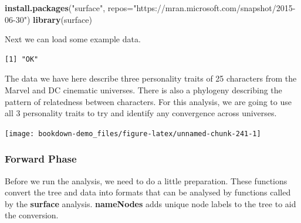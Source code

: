 \documentclass[
]{book}
\newenvironment{Shaded}{\begin{snugshade}}{\end{snugshade}}
\newcommand{\DataTypeTok}[1]{\textcolor[rgb]{0.13,0.29,0.53}{#1}}
\newcommand{\KeywordTok}[1]{\textcolor[rgb]{0.13,0.29,0.53}{\textbf{#1}}}
\newcommand{\NormalTok}[1]{#1}
\newcommand{\OperatorTok}[1]{\textcolor[rgb]{0.81,0.36,0.00}{\textbf{#1}}}
\newcommand{\StringTok}[1]{\textcolor[rgb]{0.31,0.60,0.02}{#1}}
\begin{document}
\begin{Shaded}
\begin{Highlighting}[]
\KeywordTok{install.packages}\NormalTok{(}\StringTok{"surface"}\NormalTok{, }\DataTypeTok{repos=}\StringTok{"https://mran.microsoft.com/snapshot/2015{-}06{-}30"}\NormalTok{)}
\KeywordTok{library}\NormalTok{(surface)}
\end{Highlighting}
\end{Shaded}

Next we can load some example data.

\begin{Shaded}
\end{Shaded}

\begin{verbatim}
[1] "OK"
\end{verbatim}

The data we have here describe three personality traits of 25 characters from the Marvel and DC cinematic universes. There is also a phylogeny describing the pattern of relatedness between characters. For this analysis, we are going to use all 3 personality traits to try and identify any convergence across universes.

\begin{center}\texttt{[image: bookdown-demo\_files/figure-latex/unnamed-chunk-241-1]} \end{center}

\hypertarget{forward-phase}{%
\subsubsection{Forward Phase}\label{forward-phase}}

Before we run the analysis, we need to do a little preparation. These functions convert the tree and data into formats that can be analysed by functions called by the \textbf{surface} analysis. \textbf{nameNodes} adds unique node labels to the tree to aid the conversion.
\end{document}
